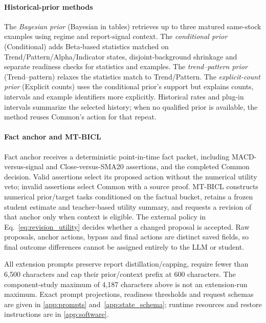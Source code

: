 \paragraph{Historical-prior methods}
The \emph{Bayesian prior} (Bayesian in tables) retrieves up to three matured same-stock examples using regime and report-signal context. The \emph{conditional prior} (Conditional) adds Beta-based statistics matched on Trend/Pattern/Alpha/Indicator states, disjoint-background shrinkage and separate readiness checks for statistics and examples. The \emph{trend--pattern prior} (Trend--pattern) relaxes the statistics match to Trend/Pattern. The \emph{explicit-count prior} (Explicit counts) uses the conditional prior's support but explains counts, intervals and example identifiers more explicitly. Historical rates and plug-in intervals summarize the selected history; when no qualified prior is available, the method reuses Common's action for that repeat.

\paragraph{Fact anchor and MT-BICL}
Fact anchor receives a deterministic point-in-time fact packet, including MACD-versus-signal and Close-versus-SMA20 assertions, and the completed Common decision. Valid assertions select its proposed action without the numerical utility veto; invalid assertions select Common with a source proof. MT-BICL constructs numerical prior/target tasks conditioned on the factual bucket, retains a frozen student estimate and teacher-based utility summary, and requests a revision of that anchor only when context is eligible. The external policy in Eq.~\ref{eq:revision_utility} decides whether a changed proposal is accepted. Raw proposals, anchor actions, bypass and final actions are distinct saved fields, so final outcome differences cannot be assigned entirely to the LLM or student.

All extension prompts preserve report distillation/capping, require fewer than 6,500 characters and cap their prior/context prefix at 600 characters. The component-study maximum of 4,187 characters above is not an extension-run maximum. Exact prompt projections, readiness thresholds and request schemas are given in \ref{app:prompts} and~\ref{app:state_schema}; runtime resources and restore instructions are in \ref{app:software}.
\FloatBarrier
